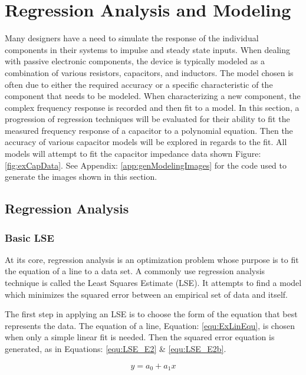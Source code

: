 \section {Regression Analysis and Modeling}
\label{sec:regression}

Many designers have a need to simulate the response of the individual components in their systems to impulse and steady state inputs. When dealing with passive electronic components, the device is typically modeled as a combination of various resistors, capacitors, and inductors. The model chosen is often due to either the required accuracy or a specific characteristic of the component that needs to be modeled. When characterizing a new component, the complex frequency response is recorded and then fit to a model. In this section, a progression of regression techniques will be evaluated for their ability to fit the measured frequency response of a capacitor to a polynomial equation. Then the accuracy of various capacitor models will be explored in regards to the fit. All models will attempt to fit the capacitor impedance data shown Figure: \ref{fig:exCapData}. See Appendix: \ref{app:genModelingImages} for the code used to generate the images shown in this section.



\subsection{Regression Analysis}
\label{sec:RegressionAnalysis}
\subsubsection{Basic LSE}
At its core, regression analysis is an optimization problem whose purpose is to fit the equation of a line to a data set. A commonly use regression analysis technique is called the Least Squares Estimate (LSE). It attempts to find a model which minimizes the squared error between an empirical set of data and itself.

The first step in applying an LSE is to choose the form of the equation that best represents the data. The equation of a line, Equation: \eqref{equ:ExLinEqu}, is chosen when only a simple linear fit is needed.
Then the squared error equation is generated, as in Equations: \eqref{equ:LSE_E2} \& \eqref{equ:LSE_E2b}.

\begin{equation}
    \label{equ:ExLinEqu}
    y = a_0 + a_1 x
\end{equation}

